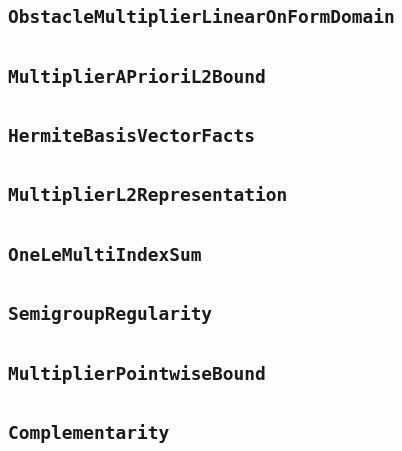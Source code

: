 \documentclass[11pt]{amsart}
\theoremstyle{definition}
\begin{document}
\subsection{\texorpdfstring{\texttt{ObstacleMultiplierLinearOnFormDomain}}{ObstacleMultiplierLinearOnFormDomain}}\label{node:ObstacleMultiplierLinearOnFormDomain}


\subsection{\texorpdfstring{\texttt{MultiplierAPrioriL2Bound}}{MultiplierAPrioriL2Bound}}\label{node:MultiplierAPrioriL2Bound}


\subsection{\texorpdfstring{\texttt{HermiteBasisVectorFacts}}{HermiteBasisVectorFacts}}\label{node:HermiteBasisVectorFacts}


\subsection{\texorpdfstring{\texttt{MultiplierL2Representation}}{MultiplierL2Representation}}\label{node:MultiplierL2Representation}


\subsection{\texorpdfstring{\texttt{OneLeMultiIndexSum}}{OneLeMultiIndexSum}}\label{node:OneLeMultiIndexSum}


\subsection{\texorpdfstring{\texttt{SemigroupRegularity}}{SemigroupRegularity}}\label{node:SemigroupRegularity}


\subsection{\texorpdfstring{\texttt{MultiplierPointwiseBound}}{MultiplierPointwiseBound}}\label{node:MultiplierPointwiseBound}


\subsection{\texorpdfstring{\texttt{Complementarity}}{Complementarity}}\label{node:Complementarity}

\end{document}
